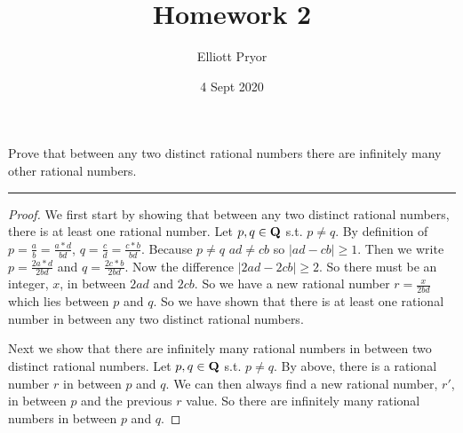 \documentclass[11pt]{article}
\title{Homework 2}
\author{Elliott Pryor}
\date{4 Sept 2020}
\begin{document}
\maketitle

Prove that between any two distinct rational numbers there are infinitely many other rational numbers.
\hrule

\begin{proof}
We first start by showing that between any two distinct rational numbers, there is at least one rational number. Let $p, q \in \mathbf{Q}$ s.t. $p \neq q$. By definition of $p = \frac{a}{b} = \frac{a * d}{bd}$, $q = \frac{c}{d} = \frac{ c * b}{bd}$. Because $p \neq q$ $ad \neq cb$ so $|ad - cb| \geq 1$. Then we write $p = \frac{2a * d}{2bd}$ and $q = \frac{2 c * b}{2bd}$. Now the difference $|2ad - 2 cb| \geq 2$. So there must be an integer, $x$, in between $2ad$ and $2cb$.  So we have a new rational number $r = \frac{x}{2bd}$ which lies between $p$ and $q$. So we have shown that there is at least one rational number in between any two distinct rational numbers.

Next we show that there are infinitely many rational numbers in between two distinct rational numbers. Let $p, q \in \mathbf{Q}$ s.t. $p \neq q$. By above, there is a rational number $r$ in between $p$ and $q$. We can then always find a new rational number, $r'$, in between $p$ and the previous $r$ value. So there are infinitely many rational numbers in between $p$ and $q$.

\end{proof}
\end{document}
